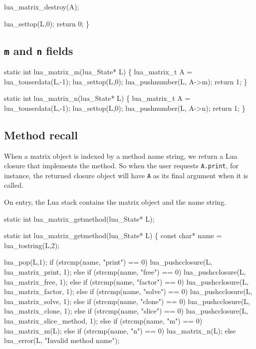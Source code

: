     lua_matrix_destroy(A);

    lua_settop(L,0);
    return 0;
\}

\nwendcode{}\nwdocspar


\subsection{{\tt{}m} and {\tt{}n} fields}

\nwenddocs{}\plusendmoddef
static int lua_matrix_m(lua_State* L)
\{
    lua_matrix_t A = lua_touserdata(L,-1);
    lua_settop(L,0);
    lua_pushnumber(L, A->m);
    return 1;
\}

static int lua_matrix_n(lua_State* L)
\{
    lua_matrix_t A = lua_touserdata(L,-1);
    lua_settop(L,0);
    lua_pushnumber(L, A->n);
    return 1;
\}

\nwendcode{}\nwdocspar


\subsection{Method recall}

When a matrix object is indexed by a method name string,
we return a Lua closure that implements the method.
So when the user requests {\tt{}A.print}, for instance,
the returned closure object will have {\tt{}A} as its final
argument when it is called.

On entry, the Lua stack contains the matrix object
and the name string.

\nwenddocs{}\endmoddef
static int lua_matrix_getmethod(lua_State* L);

\nwendcode{}\nwdocspar

\nwenddocs{}\plusendmoddef
static int lua_matrix_getmethod(lua_State* L)
\{
    const char* name = lua_tostring(L,2);

    lua_pop(L,1);
    if (strcmp(name, "print") == 0)
        lua_pushcclosure(L, lua_matrix_print, 1);
    else if (strcmp(name, "free") == 0)
        lua_pushcclosure(L, lua_matrix_free, 1);
    else if (strcmp(name, "factor") == 0)
        lua_pushcclosure(L, lua_matrix_factor, 1);
    else if (strcmp(name, "solve") == 0)
        lua_pushcclosure(L, lua_matrix_solve, 1);
    else if (strcmp(name, "clone") == 0)
        lua_pushcclosure(L, lua_matrix_clone, 1);
    else if (strcmp(name, "slice") == 0)
        lua_pushcclosure(L, lua_matrix_slice_method, 1);
    else if (strcmp(name, "m") == 0)
        lua_matrix_m(L);
    else if (strcmp(name, "n") == 0)
        lua_matrix_n(L);
    else
        lua_error(L, "Invalid method name");

